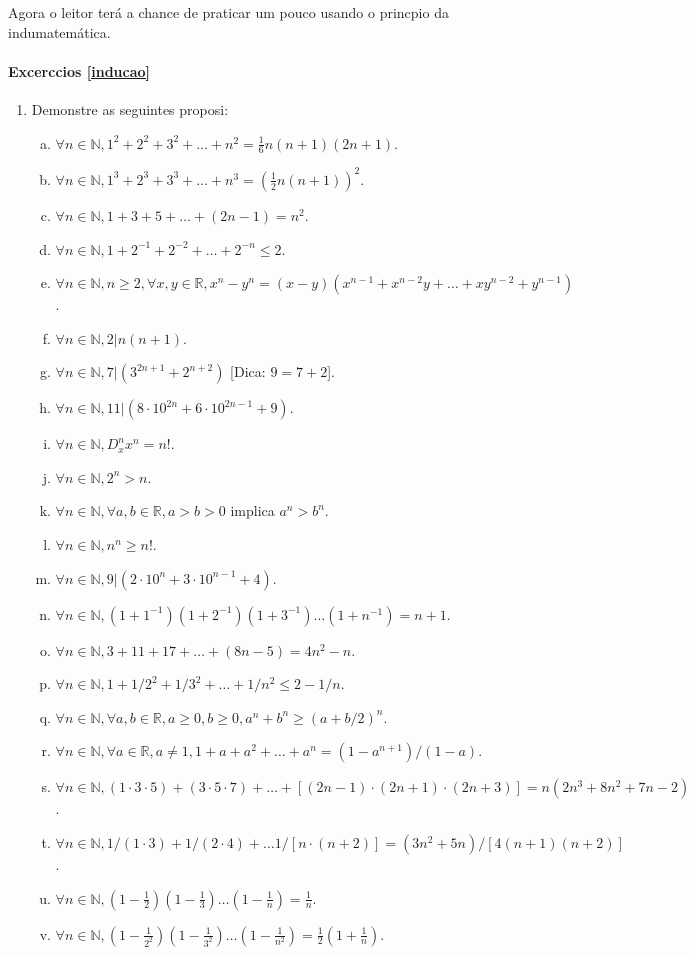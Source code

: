 Agora o leitor ter\'a a chance de praticar um pouco usando o princ\ih pio da indu\cao matem\'atica.

\paragraph{Excerc\ih cios \ref{inducao}}

\begin{enumerate}[{\bf 1.}]
\item\label{inducaoexce1} Demonstre as seguintes proposi\cois:
\begin{enumerate}[a)]
\item\label{inducaoexce1a} $\forall n\in\mathbb{N}, 1^2+2^2+3^2+\ldots+n^2=\frac{1}{6}n(n+1)(2n+1)$.
\item\label{inducaoexce1b} $\forall n\in\mathbb{N}, 1^3+2^3+3^3+\ldots+n^3=(\frac{1}{2}n(n+1))^2$.
\item $\forall n\in\mathbb{N}, 1+3+5+\ldots+(2n-1)=n^2$.
\item $\forall n\in\mathbb{N}, 1+2^{-1}+2^{-2}+\ldots+2^{-n}\leq 2$.
\item $\forall n\in\mathbb{N}, n\geq 2, \forall x,y\in\mathbb{R}, x^n-y^n=(x-y)(x^{n-1}+x^{n-2}y+\ldots+xy^{n-2}+y^{n-1})$.
\item $\forall n\in\mathbb{N}, 2|n(n+1)$.
\item $\forall n\in\mathbb{N}, 7|(3^{2n+1}+2^{n+2})$ [Dica: $9=7+2$].
\item $\forall n\in\mathbb{N}, 11|(8\cdot 10^{2n}+6\cdot 10^{2n-1}+9)$.
\item $\forall n\in\mathbb{N}, D^n_x x^n=n!$.
\item $\forall n\in\mathbb{N}, 2^n>n$.
\item $\forall n\in\mathbb{N}, \forall a,b\in\mathbb{R}, a>b>0$ implica $a^n>b^n$.
\item $\forall n\in\mathbb{N}, n^n\geq n!$.
\item $\forall n\in\mathbb{N}, 9|(2\cdot 10^n+3\cdot 10^{n-1}+4)$.
\item $\forall n\in\mathbb{N}, (1+1^{-1})(1+2^{-1})(1+3^{-1})\ldots(1+n^{-1})=n+1$.
\item $\forall n\in\mathbb{N}, 3+11+17+\ldots+(8n-5)=4n^2-n$.
\item $\forall n\in\mathbb{N}, 1+1/2^2+1/3^2+\ldots+1/n^2\leq 2-1/n$.
\item $\forall n\in\mathbb{N}, \forall a,b\in\mathbb{R}, a\geq 0, b\geq 0, a^n+b^n\geq(a+b/2)^n$.
\item $\forall n\in\mathbb{N}, \forall a\in\mathbb{R}, a\neq 1, 1+a+a^2+\ldots+a^n=(1-a^{n+1})/(1-a)$.
\item $\forall n\in\mathbb{N}, (1\cdot 3\cdot 5)+(3\cdot 5\cdot 7)+\ldots+[(2n-1)\cdot (2n+1)\cdot (2n+3)]=n(2n^3+8n^2+7n-2)$.
\item $\forall n\in\mathbb{N}, 1/(1\cdot 3)+1/(2\cdot 4)+\ldots1/[n\cdot(n+2)]=(3n^2+5n)/[4(n+1)(n+2)]$.
\item $\forall n\in\mathbb{N}, (1-\frac{1}{2})(1-\frac{1}{3})\ldots(1-\frac{1}{n})=\frac{1}{n}$.
\item $\forall n\in\mathbb{N}, (1-\frac{1}{2^2})(1-\frac{1}{3^2})\ldots(1-\frac{1}{n^2})=\frac{1}{2}(1+\frac{1}{n})$.
\end{enumerate}


\end{enumerate}
